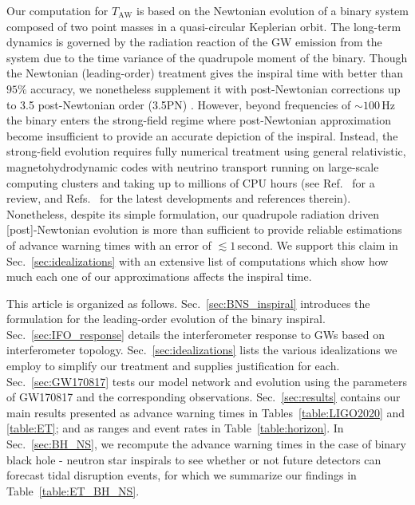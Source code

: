 \documentclass[prd,amsmath,amssymb,aps,floats,amsfonts,notitlepage,superscriptaddress,eqsecnum,nofootinbib,10pt]{revtex4-1}
\begin{document}
Our computation for $T_\text{AW}$ is based on the Newtonian evolution of a binary system composed of two point masses in a quasi-circular Keplerian orbit. 
The long-term dynamics is governed by the radiation reaction of 
the GW emission from the system due to the time variance of the quadrupole moment of the binary.
Though the Newtonian (leading-order) treatment gives the 
inspiral time with better than $ 95\%$ accuracy,
we nonetheless supplement it with post-Newtonian corrections up to 3.5 post-Newtonian order (3.5PN) \cite{Blanchet_LRR}.
However, beyond frequencies of $\sim 100\,$Hz the binary enters the strong-field regime where post-Newtonian
approximation become insufficient to provide an accurate depiction of the inspiral.
Instead, the strong-field evolution requires fully
numerical treatment using general relativistic, magnetohydrodynamic codes 
with neutrino transport running on large-scale computing clusters and taking up to millions of CPU hours 
(see Ref.~\cite{Shibata_book, Faber:2012rw} for a review, and Refs.~\cite{Baiotti:2016qnr,Kyutoku:2017voj, Zappa:2017xba, Dietrich:2018upm, Dietrich:2018phi} for the latest developments and references therein).
Nonetheless, despite its simple formulation, our quadrupole radiation driven [post]-Newtonian
evolution is more than sufficient to provide reliable estimations of advance warning times with an error of $\lesssim 1\,$second.
We support this claim in Sec.~\ref{sec:idealizations} with an extensive list of computations which show how much each one of our approximations affects the inspiral time.

%
This article is organized as follows. Sec.~\ref{sec:BNS_inspiral} introduces the formulation for the leading-order evolution of the binary inspiral.
Sec.~\ref{sec:IFO_response} details the interferometer response to GWs based on interferometer topology.
Sec.~\ref{sec:idealizations} lists the various idealizations we employ to simplify our treatment and supplies justification for each.
Sec.~\ref{sec:GW170817} tests our model network and evolution using the parameters of GW170817 and the corresponding observations.
Sec.~\ref{sec:results} contains our main results presented as advance warning times in Tables~\ref{table:LIGO2020} and \ref{table:ET}; 
and as ranges and event rates in Table~\ref{table:horizon}.
In Sec.~\ref{sec:BH_NS}, we recompute the advance warning times in the case of binary black hole - neutron star inspirals to see whether or not 
future detectors can forecast tidal disruption events, for which we summarize our findings in Table~\ref{table:ET_BH_NS}.
\end{document}
